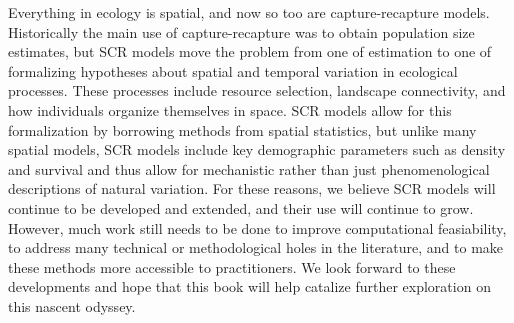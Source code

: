 Everything in ecology is spatial, and now so too are capture-recapture
models.
Historically the main use of capture-recapture was to obtain population
size estimates, but
SCR models move the problem from one of estimation to one of
formalizing hypotheses about spatial and temporal variation in
ecological processes. %
These processes include resource selection, landscape connectivity, and
how individuals organize themselves in space. SCR models allow for
this formalization by borrowing methods from spatial statistics,
but unlike many spatial models,
SCR models include key demographic parameters such as density
and survival and thus allow for mechanistic rather than just
phenomenological descriptions of natural variation.
For these reasons, we believe SCR models will continue to be developed and
extended, and their use will continue to grow.
However, much work still needs to
be done to improve computational feasiability, to address many
technical or methodological holes in the literature,
and to make these methods more accessible to practitioners.
We look forward to these developments and hope that this book will
help catalize further exploration on this nascent odyssey.


